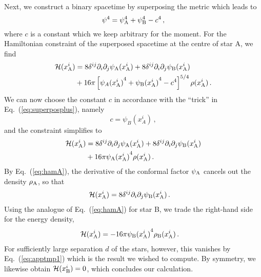 \documentclass[11pt]{report}  %
\begin{document}
Next, we construct a binary spacetime by superposing the metric
which leads to
%
\begin{equation}
    \psi^4 = \psi_{\rm A}^4 + \psi_{\rm B}^4-c^4\,,
\end{equation}
%
where $c$ is a constant which we keep arbitrary for the moment.
For the Hamiltonian constraint of the superposed spacetime
at the centre of star A, we find
%
\begin{equation}
\begin{aligned}
    \mathcal{H}(x_{\rm A}^{i}) &=  8 \delta^{ij} \partial_i\partial_j{\psi_{\rm A}({x_{\rm A}^{i}})} + 8 \delta^{ij} \partial_i\partial_j{\psi_{\rm B}({x_{\rm A}^{i}})}\\ &+  16\pi \left[{\psi_{A}({x_{\rm A}^{i}})}^4 + {\psi_{\rm B}({x_{\rm A}^{i}})}^4-c^4\right]^{5/4}\rho(x_{\rm A}^{i})\,.
\end{aligned}
\end{equation}
%
We can now choose the constant $c$ in
accordance with the ``trick'' in Eq.~(\ref{eq:superposplus}),
namely
%
\begin{equation}
   c = \psi_B(x_A^{i})\,,
\end{equation}
%
and the constraint simplifies to
\begin{equation}
\begin{aligned}
    \mathcal{H}(x_{\rm A}^{i}) &=  8 \delta^{ij} \partial_i\partial_j{\psi_{\rm A}({x_{\rm A}^{i}})} + 8 \delta^{ij} \partial_i\partial_j{\psi_{\rm B}({x_{\rm A}^{i}})}\\ &+  16\pi {\psi_{\rm A}({x_{\rm A}^{i}})}^4 \rho(x_{\rm A}^{i})\,.
\end{aligned}
\end{equation}
%
By Eq.~(\ref{eq:hamA}), the derivative of the conformal factor
$\psi_{\rm A}$ cancels out the density $\rho_{\rm A}$,
so that
%
\begin{equation}
\begin{aligned}
    \mathcal{H}(x_{\rm A}^{i}) &=   8 \delta^{ij} \partial_i\partial_j{\psi_{\rm B}({x_{\rm A}^{i}})}\,.
\end{aligned}
\end{equation}
%
Using the analogue of Eq.~(\ref{eq:hamA}) for star B, we trade
the right-hand side for the energy density,
%
\begin{equation}
\begin{aligned}
    \mathcal{H}(x_{\rm A}^{i}) &=   - 16\pi {\psi_{\rm B}({x_{\rm A}^{i}})}^4 \rho_{\rm B}(x_{\rm A}^{i})\,.
\end{aligned}
\end{equation}
%
For sufficiently large separation $d$ of the stars, however,
this vanishes by Eq.~(\ref{eq:apptmp1}) which is the result
we wished to compute. By symmetry, we likewise obtain
$\mathcal{H}(x_{\rm B}^i)=0$, which concludes our calculation.
\end{document}
